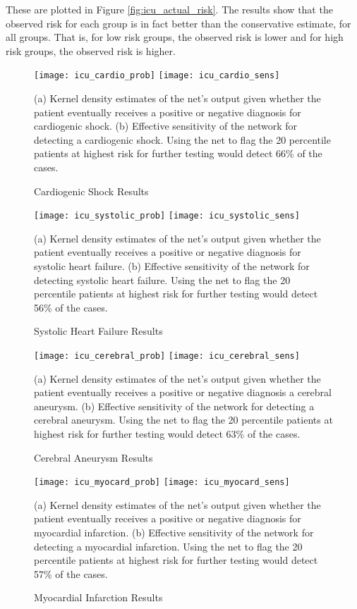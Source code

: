 These are plotted in Figure \ref{fig:icu_actual_risk}.  The results show that the observed risk for each group is in fact better than the conservative estimate, for all groups.  That is, for low risk groups, the observed risk is lower and for high risk groups, the observed risk is higher.

\begin{figure}
\texttt{[image: icu\_cardio\_prob]}
\texttt{[image: icu\_cardio\_sens]}
\caption{Cardiogenic Shock Results}
\vspace{12px}
(a) Kernel density estimates of the net's output given whether the patient eventually receives a positive or negative diagnosis for cardiogenic shock. (b) Effective sensitivity of the network for detecting a cardiogenic shock.  Using the net to flag the 20 percentile patients at highest risk for further testing would detect 66\% of the cases.
\label{fig:icu_cardio}
\end{figure}

\begin{figure}
\texttt{[image: icu\_systolic\_prob]}
\texttt{[image: icu\_systolic\_sens]}
\caption{Systolic Heart Failure Results}
\vspace{12px}
(a) Kernel density estimates of the net's output given whether the patient eventually receives a positive or negative diagnosis for systolic heart failure. (b) Effective sensitivity of the network for detecting systolic heart failure.  Using the net to flag the 20 percentile patients at highest risk for further testing would detect 56\% of the cases.
\label{fig:icu_systolic}
\end{figure}

\begin{figure}
\texttt{[image: icu\_cerebral\_prob]}
\texttt{[image: icu\_cerebral\_sens]}
\caption{Cerebral Aneurysm Results}
\vspace{12px}
(a) Kernel density estimates of the net's output given whether the patient eventually receives a positive or negative diagnosis a cerebral aneurysm. (b) Effective sensitivity of the network for detecting a cerebral aneurysm.  Using the net to flag the 20 percentile patients at highest risk for further testing would detect 63\% of the cases.
\label{fig:icu_cerebral}
\end{figure}
    
\begin{figure}
\texttt{[image: icu\_myocard\_prob]}
\texttt{[image: icu\_myocard\_sens]}
\caption{Myocardial Infarction Results}
\vspace{12px}
(a) Kernel density estimates of the net's output given whether the patient eventually receives a positive or negative diagnosis for myocardial infarction. (b) Effective sensitivity of the network for detecting a myocardial infarction.  Using the net to flag the 20 percentile patients at highest risk for further testing would detect 57\% of the cases.
\label{fig:icu_myocard}
\end{figure}

